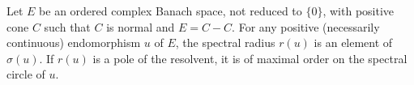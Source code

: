 Let $E$ be an ordered complex Banach space, not reduced to $\{0\}$, with positive cone $C$ such that $C$ is normal and $E = C - C$. For any positive (necessarily continuous) endomorphism $u$ of $E$, the spectral radius $r(u)$ is an element of $\sigma(u)$. If $r(u)$ is a pole of the resolvent, it is of maximal order on the spectral circle of $u$.
